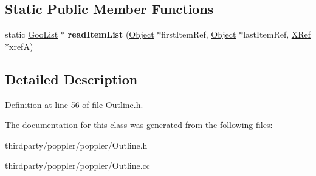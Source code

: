 \subsection*{Static Public Member Functions}
\begin{DoxyCompactItemize}
\item 
\mbox{\label{class_outline_item_ae76676418e7dbe2c669780baeca76736}} 
static \hyperlink{class_goo_list}{Goo\+List} $\ast$ {\bfseries read\+Item\+List} (\hyperlink{class_object}{Object} $\ast$first\+Item\+Ref, \hyperlink{class_object}{Object} $\ast$last\+Item\+Ref, \hyperlink{class_x_ref}{X\+Ref} $\ast$xrefA)
\end{DoxyCompactItemize}


\subsection{Detailed Description}


Definition at line 56 of file Outline.\+h.



The documentation for this class was generated from the following files\+:\begin{DoxyCompactItemize}
\item 
thirdparty/poppler/poppler/Outline.\+h\item 
thirdparty/poppler/poppler/Outline.\+cc\end{DoxyCompactItemize}
